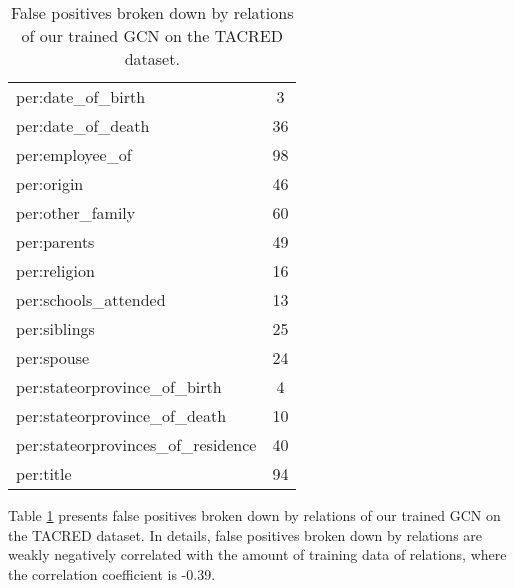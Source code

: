 \documentclass[11pt,a4paper]{article}
\begin{document}
\begin{table}[t]
\begin{tabular}{lc}
		per:date\_of\_birth                   & 3  \\
		per:date\_of\_death                   & 36 \\
		per:employee\_of                      & 98 \\
		per:origin                            & 46 \\
		per:other\_family                     & 60 \\
		per:parents                           & 49 \\
		per:religion                          & 16 \\
		per:schools\_attended                 & 13 \\
		per:siblings                          & 25 \\
		per:spouse                            & 24 \\
		per:stateorprovince\_of\_birth        & 4  \\
		per:stateorprovince\_of\_death        & 10 \\
		per:stateorprovinces\_of\_residence   & 40 \\
		per:title                             & 94 \\
		\bottomrule
	\end{tabular}
	\caption{\label{tab:stat-fp-tacred} False positives broken down by relations of our trained GCN on the TACRED dataset. }
\end{table}
Table \ref{tab:stat-fp-tacred} presents  false positives broken down by relations of our trained GCN on the TACRED dataset. 
In details, false positives  broken down by relations are weakly negatively correlated with the amount of training data of relations, where the correlation coefficient is -0.39. 
\end{document}
